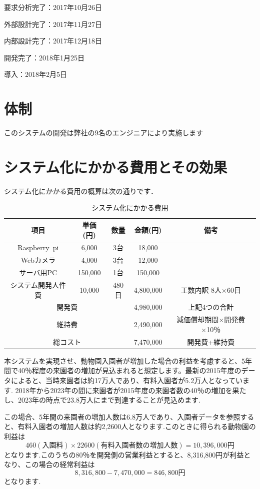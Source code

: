 \documentclass[a4j]{jarticle}
\begin{document}
要求分析完了：2017年10月26日

外部設計完了：2017年11月27日

内部設計完了：2017年12月18日

開発完了：2018年1月25日

導入：2018年2月5日

\section{体制}
このシステムの開発は弊社の9名のエンジニアにより実施します


\section{システム化にかかる費用とその効果}
システム化にかかる費用の概算は次の通りです．
\begin{table}[H]
  \caption{システム化にかかる費用}
  \begin{center}
    \begin{tabular}{|c|c|c|c|c|} \hline
      項目&単価(円)&数量&金額(円)&備考 \\ \hline
      Raspberry~pi&6,000&3台&18,000&　\\ \hline
      Webカメラ&4,000&3台&12,000&　\\ \hline
      サーバ用PC&150,000&1台&150,000&　\\ \hline
      システム開発人件費&10,000&480日&4,800,000&工数内訳 8人×60日 \\ \hline
      \multicolumn{3}{|c|}{開発費}&4,980,000&上記4つの合計 \\ \hline
      \multicolumn{3}{|c|}{維持費}&2,490,000&減価償却期間×開発費×10％ \\ \hline %
      \multicolumn{3}{|c|}{総コスト}&7,470,000&開発費+維持費 \\ \hline
    \end{tabular}
  \end{center}
\end{table}
本システムを実現させ、動物園入園者が増加した場合の利益を考慮すると、5年間で40％程度の来園者の増加が見込まれると想定します。最新の2015年度のデータによると、当時来園者は約17万人であり、有料入園者が5.2万人となっています.
2018年から2023年の間に来園者が2015年度の来園者数の40％の増加を果たし、2023年の時点で23.8万人にまで到達することが見込めます.

この場合、5年間の来園者の増加人数は6.8万人であり、入園者データを参照すると、有料入園者の増加人数は約2,2600人となります.このときに得られる動物園の利益は
\[460(入園料) \times 22600(有料入園者数の増加人数) = 10,396,000円\]
となります.このうちの80％を開発側の営業利益とすると、8,316,800円が利益となり、この場合の経常利益は\[8,316,800-7,470,000=846,800円\]となります.
\end{document}
